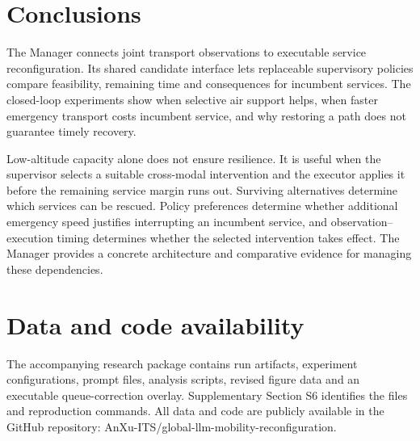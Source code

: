 \documentclass[]{interact}
\theoremstyle{plain}
\theoremstyle{definition}
\theoremstyle{remark}
\begin{document}
\section{Conclusions}

The Manager connects joint transport observations to executable service reconfiguration. Its shared candidate interface lets replaceable supervisory policies compare feasibility, remaining time and consequences for incumbent services. The closed-loop experiments show when selective air support helps, when faster emergency transport costs incumbent service, and why restoring a path does not guarantee timely recovery.

Low-altitude capacity alone does not ensure resilience. It is useful when the supervisor selects a suitable cross-modal intervention and the executor applies it before the remaining service margin runs out. Surviving alternatives determine which services can be rescued. Policy preferences determine whether additional emergency speed justifies interrupting an incumbent service, and observation--execution timing determines whether the selected intervention takes effect. The Manager provides a concrete architecture and comparative evidence for managing these dependencies.

\section*{Data and code availability}
The accompanying research package contains run artifacts, experiment configurations, prompt files, analysis scripts, revised figure data and an executable queue-correction overlay. Supplementary Section S6 identifies the files and reproduction commands. All data and code are publicly available in the GitHub repository: AnXu-ITS/global-llm-mobility-reconfiguration.



\end{document}
